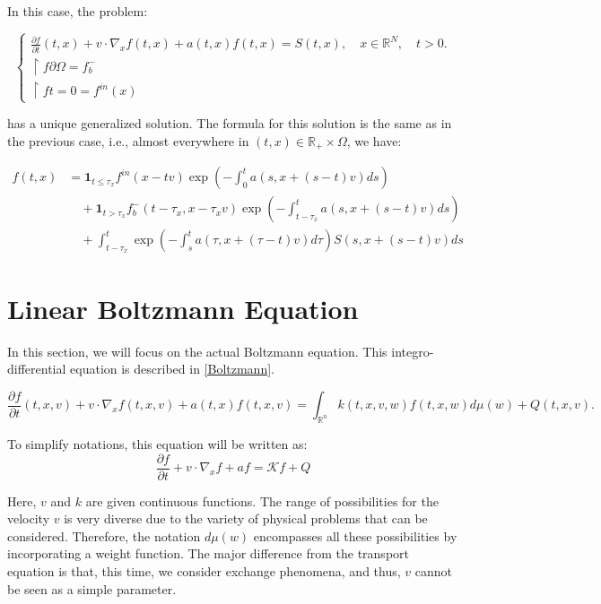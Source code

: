 \documentclass[a4paper, 11pt]{article}
\begin{document}
In this case, the problem:

\[
\begin{cases}
	\frac{\partial f}{\partial t}(t,x)+v \cdot \nabla_x f(t,x)+ a(t,x)f(t,x)=S(t,x), \quad x \in \mathbb{R}^N, \quad t>0.\\
	\restriction{f}{\partial \Omega}= f_b^-\\
	\restriction{f}{t=0}= f^{in}(x)
\end{cases}
\]

has a unique generalized solution. The formula for this solution is the same as in the previous case, i.e., almost everywhere in $(t,x) \in \mathbb{R}_+ \times \Omega$, we have:

\[
\boxed{
	\begin{aligned}
		f(t,x) &= \mathbf{1}_{t \leq \tau_x} f^{in} (x-tv) \exp\left(-\int_0^t a(s,x+(s-t)v)ds\right) \\
		&\quad + \mathbf{1}_{t > \tau_x} f_b^- (t-\tau_x,x-\tau_x v) \exp\left(-\int_{t-\tau_x}^t a(s,x+(s-t)v)ds\right) \\
		&\quad + \int_{t-\tau_x}^t \exp\left(-\int_{s}^{t}a(\tau,x+(\tau-t)v)d\tau\right) S(s,x+(s-t)v)ds
\end{aligned}}
\]







\section{Linear Boltzmann Equation}

In this section, we will focus on the actual Boltzmann equation. This integro-differential equation is described in \ref{Boltzmann}.

\begin{equation} \label{Boltzmann}
	\frac{\partial f}{\partial t}(t,x,v)+v \cdot \nabla_x f(t,x,v) + a(t,x)f(t,x,v) = \int_{\mathbb{R}^n}k(t,x,v,w)f(t,x,w)d\mu(w)+Q(t,x,v).
\end{equation}

To simplify notations, this equation will be written as: 
\[ \frac{\partial f}{\partial t}+v \cdot \nabla_x f +af =   \mathcal{K} f +Q \]

Here, $v$ and $k$ are given continuous functions. The range of possibilities for the velocity $v$ is very diverse due to the variety of physical problems that can be considered. Therefore, the notation $d\mu(w)$ encompasses all these possibilities by incorporating a weight function. The major difference from the transport equation is that, this time, we consider exchange phenomena, and thus, $v$ cannot be seen as a simple parameter.
\end{document}
